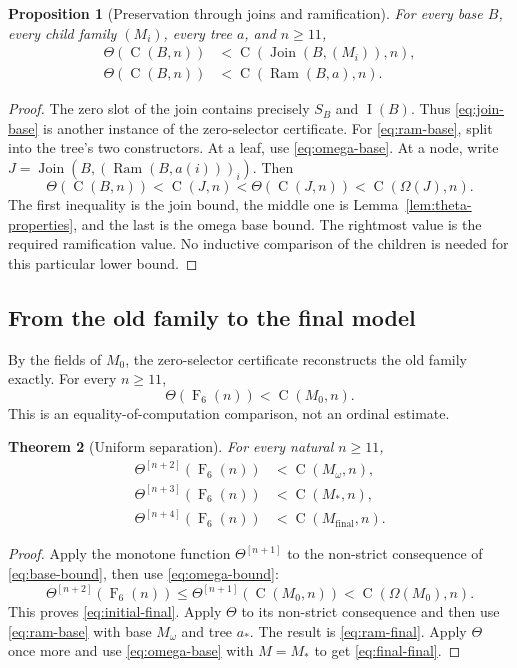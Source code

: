\documentclass[11pt,letterpaper]{article}
\newtheorem{theorem}{Theorem}[section]
\newtheorem{proposition}[theorem]{Proposition}
\theoremstyle{definition}
\newcommand{\MJoin}{\operatorname{Join}}
\newcommand{\Ram}{\operatorname{Ram}}
\newcommand{\Val}{\operatorname{C}}
\newcommand{\idx}{\operatorname{I}}
\newcommand{\FF}{\operatorname{F}}
\newcommand{\Iter}[2]{#1^{[#2]}}
\begin{document}
\begin{proposition}[Preservation through joins and ramification]
\label{prop:ram-base}
For every base $B$, every child family $(M_i)$, every tree $a$, and $n\ge11$,
\begin{align}
 \Theta(\Val(B,n))&<\Val(\MJoin(B,(M_i)),n),\label{eq:join-base}\\
 \Theta(\Val(B,n))&<\Val(\Ram(B,a),n).\label{eq:ram-base}
\end{align}
\end{proposition}
\begin{proof}
The zero slot of the join contains precisely $S_B$ and $\idx(B)$. Thus
\eqref{eq:join-base} is another instance of the zero-selector certificate.
For \eqref{eq:ram-base}, split into the tree's two constructors. At a leaf,
use \eqref{eq:omega-base}. At a node, write
$J=\MJoin(B,(\Ram(B,a(i)))_i)$. Then
\[
 \Theta(\Val(B,n))<\Val(J,n)
       <\Theta(\Val(J,n))<\Val(\Omega(J),n).
\]
The first inequality is the join bound, the middle one is
Lemma~\ref{lem:theta-properties}, and the last is the omega base bound. The
rightmost value is the required ramification value. No inductive comparison
of the children is needed for this particular lower bound.
\end{proof}

\subsection{From the old family to the final model}

By the fields of $M_0$, the zero-selector certificate reconstructs the old
family exactly. For every $n\ge11$,
\begin{equation}\label{eq:base-bound}
                     \Theta(\FF_6(n))<\Val(M_0,n).
\end{equation}
This is an equality-of-computation comparison, not an ordinal estimate.

\begin{theorem}[Uniform separation]\label{thm:uniform}
For every natural $n\ge11$,
\begin{align}
 \Iter\Theta{n+2}(\FF_6(n))&<\Val(M_\omega,n),\label{eq:initial-final}\\
 \Iter\Theta{n+3}(\FF_6(n))&<\Val(M_*,n),\label{eq:ram-final}\\
 \Iter\Theta{n+4}(\FF_6(n))&<\Val(M_{\mathrm{final}},n).
 \label{eq:final-final}
\end{align}
\end{theorem}
\begin{proof}
Apply the monotone function $\Iter\Theta{n+1}$ to the non-strict consequence of
\eqref{eq:base-bound}, then use \eqref{eq:omega-bound}:
\[
 \Iter\Theta{n+2}(\FF_6(n))
 \le\Iter\Theta{n+1}(\Val(M_0,n))
 <\Val(\Omega(M_0),n).
\]
This proves \eqref{eq:initial-final}. Apply $\Theta$ to its non-strict
consequence and then use \eqref{eq:ram-base} with base $M_\omega$ and tree
$a_*$. The result is \eqref{eq:ram-final}. Apply $\Theta$ once more and use
\eqref{eq:omega-base} with $M=M_*$ to get \eqref{eq:final-final}.
\end{proof}
\end{document}
